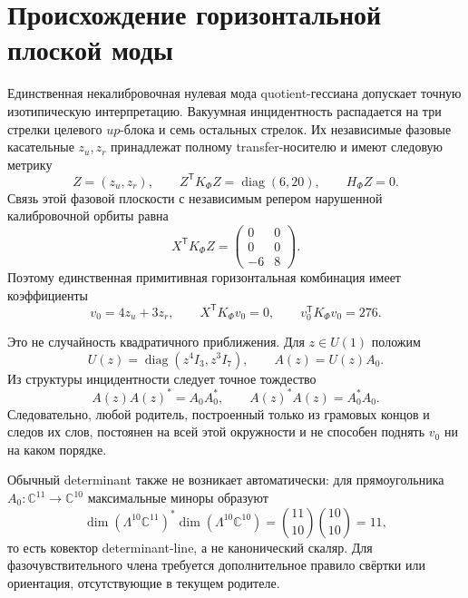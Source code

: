 \chapter{Происхождение горизонтальной плоской моды}
\label{ch:v8-horizontal-flat-direction-parent-lift-gate}

Единственная некалибровочная нулевая мода quotient-гессиана допускает
точную изотипическую интерпретацию. Вакуумная инцидентность распадается на
три стрелки целевого $up$-блока и семь остальных стрелок. Их независимые
фазовые касательные $z_u,z_r$ принадлежат полному transfer-носителю и имеют
следовую метрику
\begin{equation}
 Z=(z_u,z_r),
 \qquad Z^{\mathsf T}K_{\Phi}Z=\operatorname{diag}(6,20),
 \qquad H_{\Phi}Z=0.
 \label{eq:v8-horizontal-phase-plane}
\end{equation}
Связь этой фазовой плоскости с независимым репером нарушенной
калибровочной орбиты равна
\begin{equation}
 X^{\mathsf T}K_{\Phi}Z=
 \begin{pmatrix}0&0\\0&0\\-6&8\end{pmatrix}.
 \label{eq:v8-horizontal-phase-orbit-coupling}
\end{equation}
Поэтому единственная примитивная горизонтальная комбинация имеет
коэффициенты
\begin{equation}
 v_0=4z_u+3z_r,
 \qquad X^{\mathsf T}K_{\Phi}v_0=0,
 \qquad v_0^{\mathsf T}K_{\Phi}v_0=276.
 \label{eq:v8-horizontal-phase-four-three}
\end{equation}

Это не случайность квадратичного приближения. Для $z\in U(1)$ положим
\begin{equation}
 U(z)=\operatorname{diag}(z^4I_3,z^3I_7),
 \qquad A(z)=U(z)A_0.
 \label{eq:v8-horizontal-phase-circle}
\end{equation}
Из структуры инцидентности следует точное тождество
\begin{equation}
 A(z)A(z)^*=A_0A_0^*,
 \qquad A(z)^*A(z)=A_0^*A_0.
 \label{eq:v8-horizontal-phase-gram-invariance}
\end{equation}
Следовательно, любой родитель, построенный только из грамовых концов и
следов их слов, постоянен на всей этой окружности и не способен поднять
$v_0$ ни на каком порядке.

Обычный determinant также не возникает автоматически: для прямоугольника
$A_0:\mathbb C^{11}\to\mathbb C^{10}$ максимальные миноры образуют
\begin{equation}
 \dim\!\left(\Lambda^{10}\mathbb C^{11}\right)^*
 \dim\!\left(\Lambda^{10}\mathbb C^{10}\right)
 =\binom{11}{10}\binom{10}{10}=11,
 \label{eq:v8-horizontal-maximal-minor-carrier}
\end{equation}
то есть ковектор determinant-line, а не канонический скаляр. Для
фазочувствительного члена требуется дополнительное правило свёртки или
ориентация, отсутствующие в текущем родителе.

